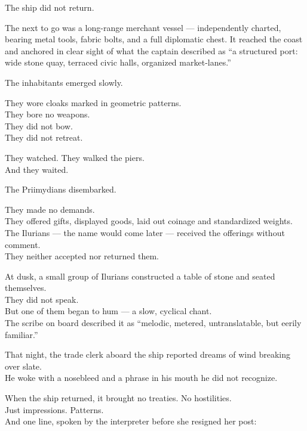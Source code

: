 \documentclass[12pt]{article}
\begin{document}
The ship did not return.

\vspace{1em}

The next to go was a long-range merchant vessel --- independently charted, bearing metal tools, fabric bolts, and a full diplomatic chest. It reached the coast and anchored in clear sight of what the captain described as ``a structured port: wide stone quay, terraced civic halls, organized market-lanes.”

The inhabitants emerged slowly.

They wore cloaks marked in geometric patterns.\\
They bore no weapons.\\
They did not bow.\\
They did not retreat.

They watched. They walked the piers.\\
And they waited.

\vspace{1em}

The Priimydians disembarked.

They made no demands.\\
They offered gifts, displayed goods, laid out coinage and standardized weights.\\
The Ilurians --- the name would come later --- received the offerings without comment.\\
They neither accepted nor returned them.

At dusk, a small group of Ilurians constructed a table of stone and seated themselves.\\
They did not speak.\\
But one of them began to hum --- a slow, cyclical chant.\\
The scribe on board described it as ``melodic, metered, untranslatable, but eerily familiar.”

That night, the trade clerk aboard the ship reported dreams of wind breaking over slate.\\
He woke with a nosebleed and a phrase in his mouth he did not recognize.

\vspace{1em}

When the ship returned, it brought no treaties. No hostilities.\\
Just impressions. Patterns.\\
And one line, spoken by the interpreter before she resigned her post:
\end{document}

